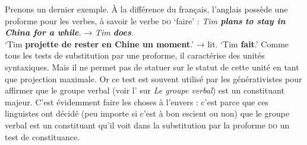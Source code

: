 {    Prenons un dernier exemple. À la différence du français, l’anglais possède une proforme pour les verbes, à savoir le verbe \textsc{do} ‘faire’ :
    \ea
        \textit{{Tim} \textbf{{plans}} \textbf{{to stay in China for a while}}.}     \textrm{→}   \textit{{Tim} \textbf{{does}}.}\\
        \glt   ‘Tim \textbf{projette de rester en Chine un moment}.’  \textrm{→}   lit. ‘Tim \textbf{fait}.’
    \z
    Comme tous les tests de substitution par une proforme, il caractérise des unités syntaxiques. Mais il ne permet pas de statuer sur le statut de cette unité en tant que projection maximale. Or ce test est souvent utilisé par les générativistes pour affirmer que le groupe verbal (voir l’ sur \textit{Le groupe verbal}) est un constituant majeur. C’est évidemment faire les choses à l’envers : c’est parce que ces linguistes ont décidé (peu importe si c’est à bon escient ou non) que le groupe verbal est un constituant qu’il voit dans la substitution par la proforme \textsc{do} un test de constituance.
}
